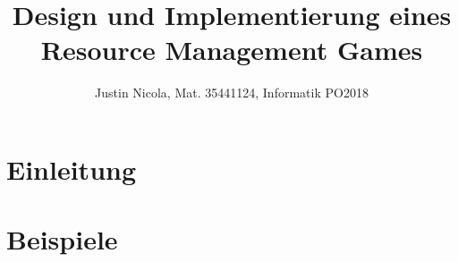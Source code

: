 \documentclass{article}
\title{Design und Implementierung eines Resource Management Games}
\author{Justin Nicola, Mat. 35441124, Informatik PO2018}
\begin{document}






\maketitle
\section{Einleitung}


\section{Beispiele}



\newpage
\printbibliography

\newpage

\end{document}
